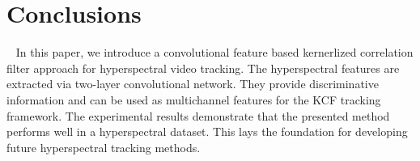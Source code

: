 \documentclass[runningheads,a4paper]{llncs}
\begin{document}
\section{Conclusions}~\label{sec:conclusions}
In this paper, we introduce a convolutional feature based kernerlized correlation filter approach for hyperspectral video tracking. The hyperspectral features are extracted via two-layer convolutional network. They provide discriminative information and can be used as multichannel features for the KCF tracking framework. The experimental results demonstrate that the presented method performs well in a hyperspectral dataset. This lays the foundation for developing future hyperspectral tracking methods.
%
%
% 
% 
%
\end{document}
